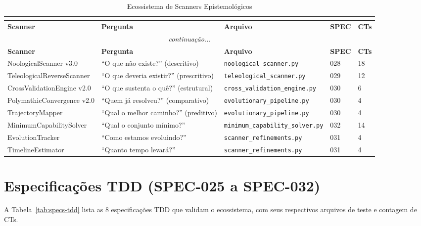 \begin{longtable}{p{3cm}p{3.5cm}p{3cm}p{2cm}p{2cm}}
\caption{Ecossistema de Scanners Epistemológicos}\\
\label{tab:scanners-apendice}\\
\toprule
\textbf{Scanner} & \textbf{Pergunta} & \textbf{Arquivo} & \textbf{SPEC} & \textbf{CTs} \\
\midrule
\endfirsthead
\multicolumn{5}{c}{\textit{continuação...}} \\
\toprule
\textbf{Scanner} & \textbf{Pergunta} & \textbf{Arquivo} & \textbf{SPEC} & \textbf{CTs} \\
\midrule
\endhead
NoologicalScanner v3.0 & ``O que não existe?'' (descritivo) & \texttt{noological\_scanner.py} & 028 & 18 \\
TeleologicalReverseScanner & ``O que deveria existir?'' (prescritivo) & \texttt{teleological\_scanner.py} & 029 & 12 \\
CrossValidationEngine v2.0 & ``O que sustenta o quê?'' (estrutural) & \texttt{cross\_validation\_engine.py} & 030 & 6 \\
PolymathicConvergence v2.0 & ``Quem já resolveu?'' (comparativo) & \texttt{evolutionary\_pipeline.py} & 030 & 4 \\
TrajectoryMapper & ``Qual o melhor caminho?'' (preditivo) & \texttt{evolutionary\_pipeline.py} & 030 & 4 \\
MinimumCapabilitySolver & ``Qual o conjunto mínimo?'' & \texttt{minimum\_capability\_solver.py} & 032 & 14 \\
EvolutionTracker & ``Como estamos evoluindo?'' & \texttt{scanner\_refinements.py} & 031 & 4 \\
TimelineEstimator & ``Quanto tempo levará?'' & \texttt{scanner\_refinements.py} & 031 & 4 \\
\bottomrule
\end{longtable}

\section{Especificações TDD (SPEC-025 a SPEC-032)}

A Tabela~\ref{tab:specs-tdd} lista as 8 especificações TDD que validam o ecossistema, com seus respectivos arquivos de teste e contagem de CTs.

